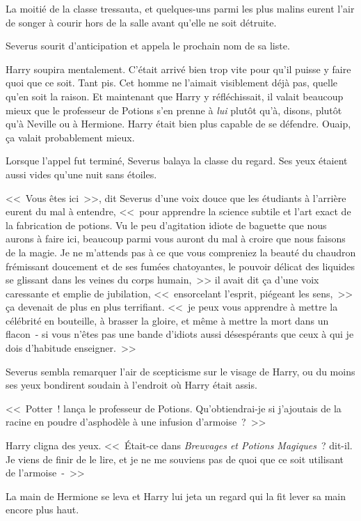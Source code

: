 La moitié de la classe tressauta, et quelques-uns parmi les plus malins eurent l'air de songer à courir hors de la salle avant qu'elle ne soit détruite.

Severus sourit d'anticipation et appela le prochain nom de sa liste.

Harry soupira mentalement. C'était arrivé bien trop vite pour qu'il puisse y faire quoi que ce soit. Tant pis. Cet homme ne l'aimait visiblement déjà pas, quelle qu'en soit la raison. Et maintenant que Harry y réfléchissait, il valait beaucoup mieux que le professeur de Potions s'en prenne à \emph{lui} plutôt qu'à, disons, plutôt qu'à Neville ou à Hermione. Harry était bien plus capable de se défendre. Ouaip, ça valait probablement mieux.

Lorsque l'appel fut terminé, Severus balaya la classe du regard. Ses yeux étaient aussi vides qu'une nuit sans étoiles.

<<~Vous êtes ici~>>, dit Severus d'une voix douce que les étudiants à l'arrière eurent du mal à entendre, <<~pour apprendre la science subtile et l'art exact de la fabrication de potions. Vu le peu d'agitation idiote de baguette que nous aurons à faire ici, beaucoup parmi vous auront du mal à croire que nous faisons de la magie. Je ne m'attends pas à ce que vous compreniez la beauté du chaudron frémissant doucement et de ses fumées chatoyantes, le pouvoir délicat des liquides se glissant dans les veines du corps humain,~>> il avait dit ça d'une voix caressante et emplie de jubilation, <<~ensorcelant l'esprit, piégeant les sens,~>> ça devenait de plus en plus terrifiant. <<~je peux vous apprendre à mettre la célébrité en bouteille, à brasser la gloire, et même à mettre la mort dans un flacon~- si vous n'êtes pas une bande d'idiots aussi désespérants que ceux à qui je dois d'habitude enseigner.~>>

Severus sembla remarquer l'air de scepticisme sur le visage de Harry, ou du moins ses yeux bondirent soudain à l'endroit où Harry était assis.

<<~Potter~! lança le professeur de Potions. Qu'obtiendrai-je si j'ajoutais de la racine en poudre d'asphodèle à une infusion d'armoise~?~>>

Harry cligna des yeux. <<~Était-ce dans \emph{Breuvages et Potions Magiques}~? dit-il. Je viens de finir de le lire, et je ne me souviens pas de quoi que ce soit utilisant de l'armoise~-~>>

La main de Hermione se leva et Harry lui jeta un regard qui la fit lever sa main encore plus haut.


